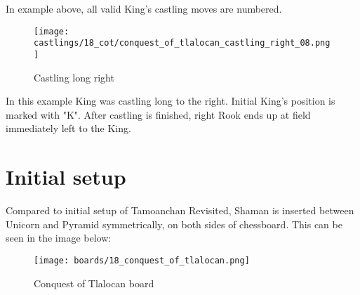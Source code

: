 In example above, all valid King's castling moves are numbered.

\noindent
\begin{figure}[!h]
\texttt{[image: castlings/18\_cot/conquest\_of\_tlalocan\_castling\_right\_08.png]}
\caption{Castling long right}
\label{fig:conquest_of_tlalocan_castling_right_08}
\end{figure}

In this example King was castling long to the right. Initial King's position is marked with "K".
After castling is finished, right Rook ends up at field immediately left to the King.

\clearpage %

\section*{Initial setup}

Compared to initial setup of Tamoanchan Revisited, Shaman is inserted between Unicorn and Pyramid
symmetrically, on both sides of chessboard. This can be seen in the image below:

\noindent
\begin{figure}[h]
\texttt{[image: boards/18\_conquest\_of\_tlalocan.png]}
\caption{Conquest of Tlalocan board}
\label{fig:18_conquest_of_tlalocan}
\end{figure}

\clearpage %
